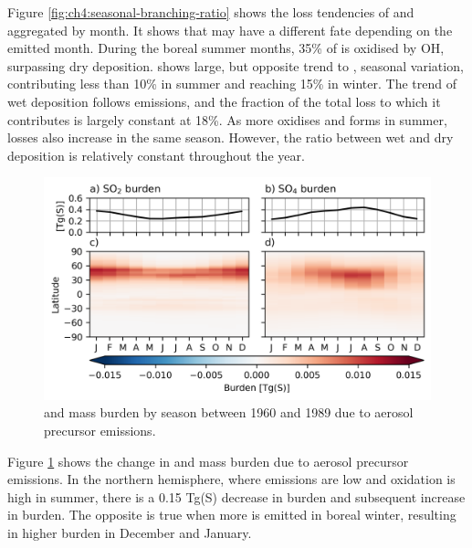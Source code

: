 Figure \ref{fig:ch4:seasonal-branching-ratio} shows the loss tendencies of  and  aggregated by month. It shows that  may have a different fate depending on the emitted month. During the boreal summer months, 35\% of  is oxidised by OH, surpassing dry deposition.  shows large, but opposite trend to , seasonal variation, contributing less than 10\%  in summer and reaching 15\% in winter. The trend of wet deposition follows emissions, and the fraction of the total loss to which it contributes is largely constant at 18\%. As more  oxidises and forms  in summer,  losses also increase in the same season. However, the ratio between  wet and dry deposition is relatively constant throughout the year.


\begin{figure}
    \centering
    \includegraphics{Chapter4/Figs/seasonal_s_burden_pothole.png}
    \caption[ and  mass burden by season between 1960 and 1989]{ and  mass burden by season between 1960 and 1989 due to aerosol precursor emissions.}
    \label{fig:ch4:seasonal-s-burden}
\end{figure}

Figure \ref{fig:ch4:seasonal-s-burden} shows the change in  and  mass burden due to aerosol precursor emissions. In the northern hemisphere, where emissions are low and oxidation is high in summer, there is a 0.15 Tg(S) decrease in  burden and subsequent increase in  burden. The opposite is true when more  is emitted in boreal winter, resulting in higher  burden in December and January. 


